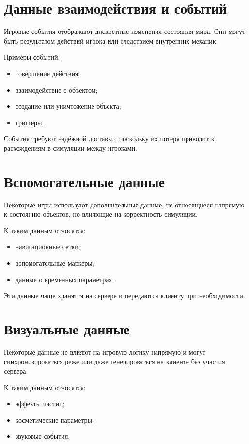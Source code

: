 \section{Данные взаимодействия и событий}

Игровые события отображают дискретные изменения состояния мира. Они могут быть результатом действий игрока или
следствием внутренних механик.

Примеры событий:
\begin{itemize}
    \item совершение действия;
    \item взаимодействие с объектом;
    \item создание или уничтожение объекта;
    \item триггеры.
\end{itemize}

События требуют надёжной доставки, поскольку их потеря приводит к
расхождениям в симуляции между игроками.

\section{Вспомогательные данные}

Некоторые игры используют дополнительные данные, не относящиеся напрямую к состоянию объектов, но влияющие на
корректность симуляции.

К таким данным относятся:
\begin{itemize}
    \item навигационные сетки;
    \item вспомогательные маркеры;
    \item данные о временных параметрах.
\end{itemize}

Эти данные чаще хранятся на сервере и передаются клиенту при необходимости.

\section{Визуальные данные}

Некоторые данные не влияют на игровую логику напрямую и могут синхронизироваться реже или даже генерироваться на
клиенте без участия сервера.

К таким данным относятся:
\begin{itemize}
    \item эффекты частиц;
    \item косметические параметры;
    \item звуковые события.
\end{itemize}

